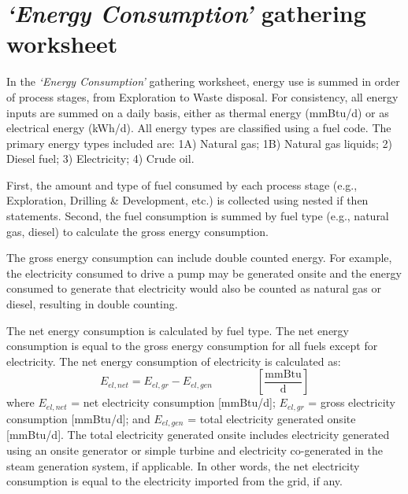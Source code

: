 \documentclass[11pt]{report}
\newcommand{\sheet}[1]{\textit{`{#1}'}}
\newcommand{\eqnunitfrac}[2]{\quad\quad \scriptstyle{\left[\frac{\text{#1}}{\text{#2}}\right]}}
\begin{document}
\clearpage

\section{\sheet{Energy Consumption} gathering worksheet}\label{sec:energy_consumption}

In the \sheet{Energy Consumption} gathering worksheet, energy use is summed in order of process stages, from Exploration to Waste disposal. For consistency, all energy inputs are summed on a daily basis, either as thermal energy (mmBtu/d) or as electrical energy (kWh/d). All energy types are classified using a fuel code. The primary energy types included are: 1A) Natural gas; 1B) Natural gas liquids; 2) Diesel fuel; 3) Electricity; 4) Crude oil.

First, the amount and type of fuel consumed by each process stage (e.g., Exploration, Drilling \& Development, etc.) is collected using nested if then statements. Second, the fuel consumption is summed by fuel type (e.g., natural gas, diesel) to calculate the gross energy consumption. 

The gross energy consumption can include double counted energy. For example, the electricity consumed to drive a pump may be generated onsite and the energy consumed to generate that electricity would also be counted as natural gas or diesel, resulting in double counting. 

The net energy consumption is calculated by  fuel type. The net energy consumption is equal to the gross energy consumption for all fuels except for electricity. The net energy consumption of electricity is calculated as:
\begin{equation}\label{net_elec}
E_{el,net}= E_{el,gr} - E_{el,gen} \quad\quad\eqnunitfrac{mmBtu}{d}
\end{equation}
where $ E_{el,net}$ = net electricity consumption [mmBtu/d]; $E_{el,gr}$ = gross electricity consumption [mmBtu/d]; and $E_{el,gen}$ = total electricity generated onsite [mmBtu/d]. The total electricity generated onsite includes electricity generated using an onsite generator or simple turbine and electricity co-generated in the steam generation system, if applicable. In other words, the net electricity consumption is equal to the electricity imported from the grid, if any.
\end{document}
